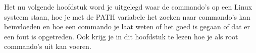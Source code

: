 Het nu volgende hoofdstuk word je uitgelegd waar de commando's op een Linux systeem staan, hoe je met de PATH variabele het zoeken naar commando's kan be\"invloeden en hoe een commando je laat weten of het goed is gegaan of dat er een fout is opgetreden.
Ook krijg je in dit hoofdstuk te lezen hoe je als root commando's uit kan voeren.
